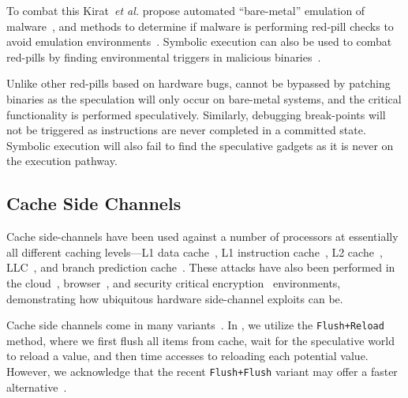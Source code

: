 To combat this Kirat~\textit{et al.} propose automated ``bare-metal''
emulation of malware~\cite{kirat2011barebox}, and methods to determine if malware
is performing red-pill checks to avoid emulation environments~\cite{kirat2014barecloud}.
Symbolic execution can also be used to combat red-pills by finding environmental triggers 
in malicious binaries~\cite{schwartz2010all}. 

Unlike other red-pills based on hardware bugs, \speculake cannot be bypassed
by patching binaries as the speculation will only occur on bare-metal systems, 
and the critical functionality is performed speculatively. Similarly, debugging 
break-points will not be triggered as instructions are never completed in a committed state.
Symbolic execution will also fail to find the speculative gadgets as it is never on the
execution pathway.

\subsection{Cache Side Channels}

Cache side-channels have been used against a number of processors at essentially
all different caching levels---L1 data
cache~\cite{percival2005cache,zhang2012cross,osvik2006cache}, L1 instruction
cache~\cite{aciiccmez2010new}, L2
cache~\cite{ristenpart2009hey,percival2005cache},
LLC~\cite{ristenpart2009hey,liu2015last}, and branch prediction
cache~\cite{aciiccmez2007power}. These attacks have also been performed in the
cloud~\cite{ristenpart2009hey,zhang2012cross},
browser~\cite{oren2015spy,google_cache_browser}, and security critical
encryption~\cite{yarom2014recovering,tromer2010efficient} environments,
demonstrating how ubiquitous hardware side-channel exploits can be. 

Cache side channels come in many
variants~\cite{neve2006refined,tromer2010efficient,yarom2014flush+,gruss2016flush+flush}.
In \speculake, we utilize the \texttt{Flush+Reload} method, where we first flush
all items from cache, wait for the speculative world to reload a value, and then
time accesses to reloading each potential value. However, we acknowledge that
the recent \texttt{Flush+Flush} variant may offer a faster
alternative~\cite{gruss2016flush+flush}.

